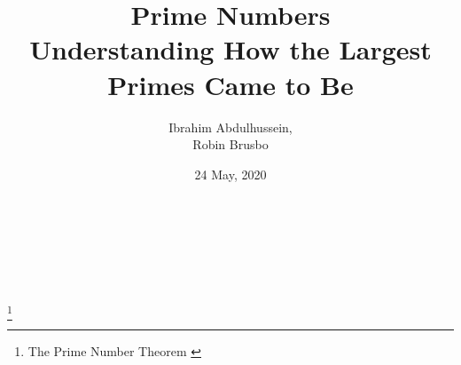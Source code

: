 \documentclass[main.tex]{subfiles}
\begin{document}
\title{
    Prime Numbers \\[0.25em] \large Understanding How the Largest Primes Came to Be
}
\author{Ibrahim Abdulhussein, \\ Robin Brusbo}
\date{24 May, 2020}

\makeatletter

\begin{titlepage}
    \thispagestyle{fancy}
    \renewcommand{\headrulewidth}{0pt}
    \renewcommand{\footrulewidth}{0pt}
    \cfoot{}
    \hbox{}\vfill
    \begin{center}
        {\LARGE\@title}\\[2em]
        {\large\@author}\\[1em]
        {\large\@date}\\[6em]
        \\
        \footnote{The Prime Number Theorem \cite{theorem:prime_num}}
    \end{center}
    \vspace{3cm}\vfill
\end{titlepage}

\makeatother
\end{document}
